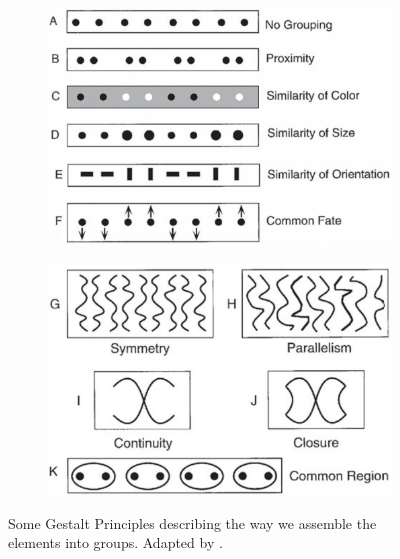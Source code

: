 \documentclass{article}
\begin{document}
\begin{figure}[h!]
    \centering
    \begin{subfigure}{0.47\textwidth}
        \centering
        \includegraphics[width=\textwidth]{Thesis/images/gestaltPrinciples.png}
        \label{figure:Gestalt1}
    \end{subfigure}
    \hfill
    \begin{subfigure}{0.47\textwidth}
        \centering
        \includegraphics[width=\textwidth]{Thesis/images/gestaltPrinciples2.png}
        \label{figure:Gestalt2}
    \end{subfigure}
    \hfill
    \caption{Some Gestalt Principles describing the way we assemble the elements into groups. Adapted by {\cite{RN212}}.}
    \label{fig:GestaltPrincips}
\end{figure}
\end{document}

